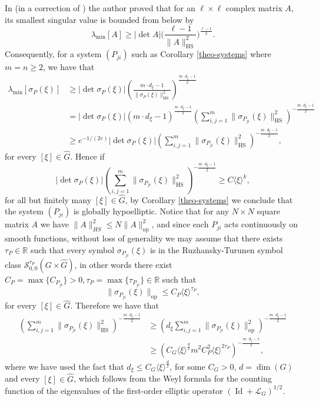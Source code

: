 \documentclass[11pt]{amsart}
\numberwithin{theorem}{section}
\numberwithin{equation}{section}
\theoremstyle{definition}
\numberwithin{example}{section}
\theoremstyle{definition}
\theoremstyle{definition}
\newcommand{\R}{\mathbb{R}}
\newcommand{\HS}{\operatorname{HS}}
\begin{document}
In \cite{errata} (in a correction of \cite{PiazzaPoliti}) the author proved that for an $\ell\times \ell$ complex matrix $A$, its smallest singular value is bounded from below by
\begin{equation*}
    \lambda_{\min}[A]\geq |\det A|{\Bigg(}\frac{\ell-1}{\|A\|_{\HS}^2}\Bigg)^{\frac{\ell-1}{2}}.
\end{equation*}
Consequently, for a system $(P_{ji})$ such as Corollary \ref{theo-systems} where $m=n\geq 2$, we have that
\begin{align*}
    \lambda_{\min}[\sigma_P(\xi)]&\geq |\det \sigma_P(\xi)|\left(\frac{m\cdot d_\xi-1}{\|\sigma_{P}(\xi)\|_{\HS}^2}\right)^{\frac{m\cdot d_\xi-1}{2}}\\&= |\det \sigma_P(\xi)|({m\cdot d_\xi-1})^{\frac{m\cdot d_\xi-1}{2}}\left({\sum_{i,j=1}^m\|\sigma_{P_{ji}}(\xi)\|_{\HS}^2}\right)^{-\frac{m\cdot d_\xi-1}{2}}\\
    &\geq e^{-1/(2e)}|\det \sigma_P(\xi)|\left({\sum_{i,j=1}^m\|\sigma_{P_{ji}}(\xi)\|_{\HS}^2}\right)^{-\frac{m\cdot d_\xi-1}{2}},
\end{align*}
for every $[\xi]\in\widehat{G}$. Hence if 
\begin{equation*}
    |\det \sigma_P(\xi)|\left({\sum_{i,j=1}^m\|\sigma_{P_{ji}}(\xi)\|_{\HS}^2}\right)^{-\frac{m\cdot d_\xi-1}{2}}\geq C\langle\xi\rangle^{k},
\end{equation*}
for all but finitely many $[\xi]\in \widehat{G}$, by Corollary \ref{theo-systems} we conclude that the system $(P_{ji})$ is globally hypoelliptic.  Notice that for any $N\times N$ square matrix $A$ we have $\|A\|_{HS}^2\leq N\|A\|_{\operatorname{op}}^2$, and since each $P_{ji}$ acts continuously on smooth functions, without loss of generality we may assume that there exists $\tau_P\in\R$ such that every symbol $\sigma_{P_{ji}}(\xi)$ is in the Ruzhansky-Turunen symbol class $\mathscr{S}^{\tau_P}_{0,0}(G\times \widehat{G})$, in other words there exist $C_{P}=\max\{C_{P_{ji}}\}>0,\tau_{P}=\max\{\tau_{P_{ji}}\}\in\R$ such that
\begin{equation}\label{ineq-symbol-class}
    \|\sigma_{P_{ji}}(\xi)\|_{\operatorname{op}}\leq C_{P}\langle\xi\rangle^{\tau_{P}},
\end{equation}
for every $[\xi]\in\widehat{G}$.
Therefore we have that
\begin{align*}
     \left({\sum_{i,j=1}^m\|\sigma_{P_{ji}}(\xi)\|_{\HS}^2}\right)^{-\frac{m\cdot d_\xi-1}{2}}&\geq \left(d_\xi{\sum_{i,j=1}^m\|\sigma_{P_{ji}}(\xi)\|_{\operatorname{op}}^2}\right)^{-\frac{m\cdot d_\xi-1}{2}}\\
     &\geq\left(C_G\langle\xi\rangle^{\frac{d}{2}}m^2 C_P^2\langle\xi\rangle^{2\tau_P}\right)^{-\frac{m\cdot d_\xi-1}{2}},
\end{align*}
 where we have used the fact that $d_\xi\leq C_G\langle\xi\rangle^{\frac{d}{2}}$, for some $C_G>0$, $d=\dim(G)$ and every $[\xi]\in\widehat{G}$, which follows from the Weyl formula for the counting function of the eigenvalues of the first-order elliptic operator $(\operatorname{Id}+\mathcal{L}_G)^{1/2}$. 
\end{document}
